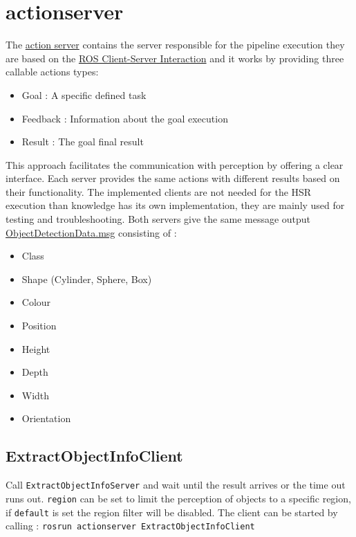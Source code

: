 \documentclass[main.tex]{subfiles}
\begin{document}
		\section{actionserver}
The \href{https://github.com/SUTURO/suturo_perception/tree/master/actionserver}{action server} contains the server responsible for the pipeline execution they are based on the \href{http://wiki.ros.org/actionlib}{ROS Client-Server Interaction} and it works by providing three callable actions types:
\begin{itemize}
    \item Goal : A specific defined task 
    \item Feedback : Information about the goal execution  
    \item Result : The goal final result 
\end{itemize}
This approach facilitates the communication with perception by offering a clear interface.
Each server provides the same actions with different results based on their functionality.
The implemented clients are not needed for the HSR execution than knowledge has its own implementation, they are mainly used for testing and troubleshooting. 
Both servers give the same message output \href{https://github.com/SUTURO/suturo_resources/blob/master/messages/suturo_perception_msgs/msg/ObjectDetectionData.msg}{ObjectDetectionData.msg} consisting of : 

    \begin{itemize}
    \item Class
    \item Shape (Cylinder, Sphere, Box)
    \item Colour
    \item Position
    \item Height
    \item Depth
    \item Width
    \item Orientation
    \end{itemize}

            \subsection{ExtractObjectInfoClient}
Call \texttt{ExtractObjectInfoServer} and wait until the result arrives or the time out runs out. \texttt{region} can be set to limit the perception of objects to a specific region, if \texttt{default} is set the region filter will be disabled. The client can be started by calling : \texttt{rosrun actionserver ExtractObjectInfoClient}
\end{document}
